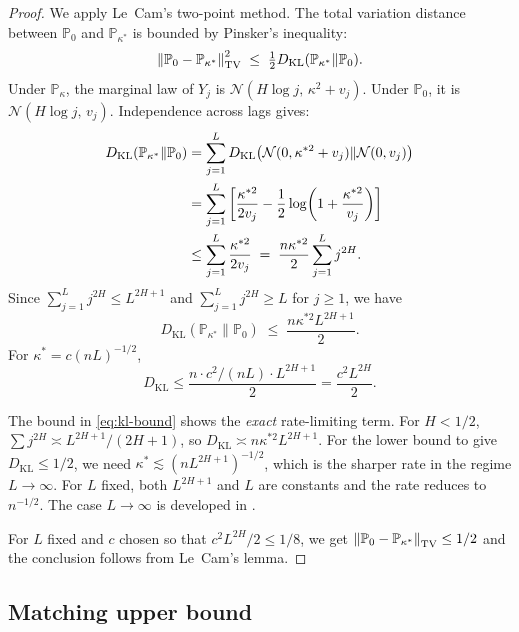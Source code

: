 \documentclass[10pt,a4paper,twocolumn]{article}
\newcommand{\Prob}{\mathbb{P}}
\newcommand{\calN}{\mathcal{N}}
\begin{document}
\begin{proof}
We apply Le~Cam's two-point method.
The total variation distance between $\Prob_0$ and $\Prob_{\kappa^*}$ is
bounded by Pinsker's inequality:
\[
    \norm{\Prob_0 - \Prob_{\kappa^*}}_{\mathrm{TV}}^2
    \;\leq\; \tfrac{1}{2} D_{\mathrm{KL}}(\Prob_{\kappa^*} \| \Prob_0).
\]
Under $\Prob_\kappa$, the marginal law of $Y_j$ is
$\calN(H\log j,\, \kappa^2 + v_j)$.  Under $\Prob_0$, it is
$\calN(H\log j,\, v_j)$.  Independence across lags gives:
\begin{align}
    D_{\mathrm{KL}}(\Prob_{\kappa^*} \| \Prob_0)
    &= \sum_{j=1}^L D_{\mathrm{KL}}\!\left(\calN(0,\kappa^{*2}+v_j)\|\calN(0,v_j)\right)
    \notag\\
    &= \sum_{j=1}^L \left[\frac{\kappa^{*2}}{2v_j} -
       \frac{1}{2}\log\!\left(1+\frac{\kappa^{*2}}{v_j}\right)\right]
     \notag\\
    &\leq \sum_{j=1}^L \frac{\kappa^{*2}}{2 v_j}
    \;=\; \frac{n\kappa^{*2}}{2} \sum_{j=1}^L j^{2H}.
    \label{eq:kl-bound}
\end{align}
Since $\sum_{j=1}^L j^{2H} \leq L^{2H+1}$ and $\sum_{j=1}^L j^{2H} \geq L$
for $j \geq 1$, we have
\[
    D_{\mathrm{KL}}(\Prob_{\kappa^*}\|\Prob_0) \;\leq\;
    \frac{n\kappa^{*2} L^{2H+1}}{2}.
\]
For $\kappa^* = c(nL)^{-1/2}$,
\[
    D_{\mathrm{KL}} \leq \frac{n \cdot c^2/(nL) \cdot L^{2H+1}}{2}
    = \frac{c^2 L^{2H}}{2}.
\]

\begin{remark}
    The bound in \eqref{eq:kl-bound} shows the \emph{exact} rate-limiting
    term.  For $H < 1/2$, $\sum j^{2H} \asymp L^{2H+1}/(2H+1)$, so
    $D_{\mathrm{KL}} \asymp n\kappa^{*2} L^{2H+1}$.  For the lower bound
    to give $D_{\mathrm{KL}} \leq 1/2$, we need $\kappa^* \lesssim
    (nL^{2H+1})^{-1/2}$, which is the sharper rate in the regime $L \to \infty$.
    For $L$ fixed, both $L^{2H+1}$ and $L$ are constants and the rate
    reduces to $n^{-1/2}$.  The case $L \to \infty$ is developed in
    .
\end{remark}

For $L$ fixed and $c$ chosen so that $c^2 L^{2H}/2 \leq 1/8$,
we get $\norm{\Prob_0 - \Prob_{\kappa^*}}_{\mathrm{TV}} \leq 1/2$
and the conclusion follows from Le~Cam's lemma.
\end{proof}

\subsection{Matching upper bound}
\end{document}
